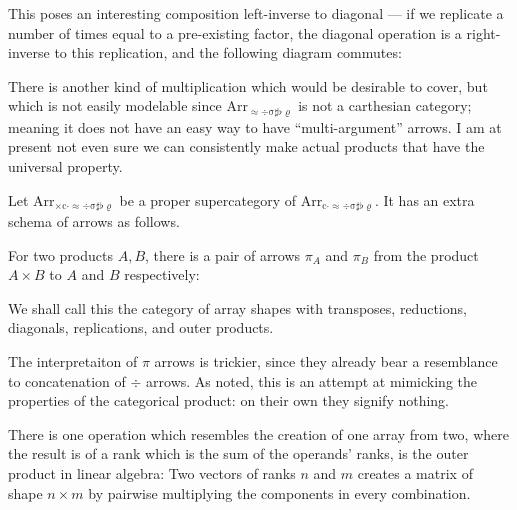 \documentclass{DIKU-report-variant}
\newcommand\mrm[1]{\mathrm{#1}}
\newcommand\brm[1]{\bm{\mrm{#1}}}
\newcommand\Arr[1]{{\brm{Arr}_{\brm{#1}}}}
\newcommand\ADSSFR{\approx\div\sigma\sharp\flat\varrho}
\newcommand\CADSSFR{c\cdot\approx\div\sigma\sharp\flat\varrho}
\newcommand\XCADSSFR{\times c\cdot\approx\div\sigma\sharp\flat\varrho}
\begin{document}
This poses an interesting composition left-inverse to
diagonal --- if we replicate a number of times equal to a pre-existing factor,
the diagonal operation is a right-inverse to this replication, and the following
diagram commutes:

\begin{center}
\end{center}

There is another kind of multiplication which would be desirable to cover, but which is
not easily modelable since \(\Arr\ADSSFR\) is not a carthesian category; meaning it does
not have an easy way to have ``multi-argument'' arrows. I am at present not even sure we can
consistently make actual products that have the universal property.

\begin{definition}
  \label{def:category-of-outer-products}
  Let \(\Arr\XCADSSFR\) be a proper supercategory of \(\Arr\CADSSFR\). It
  has an extra schema of arrows as follows.

  For two products \(A, B\), there is a pair of arrows \(\pi_A\) and \(\pi_B\)
  from the product \(A \times B\) to \(A\) and \(B\) respectively:
  \begin{center}
  \end{center}

  We shall call this the category of array shapes with transposes, reductions,
  diagonals, replications, and outer products.
\end{definition}

The interpretaiton of \(\pi\) arrows is trickier, since they already bear a resemblance
to concatenation of \(\div\) arrows. As noted, this is an attempt at mimicking
the properties of the categorical product: on their own they signify nothing.

There is one operation which resembles the creation of one array from two, where
the result is of a rank which is the sum of the operands' ranks, is the outer product
in linear algebra: Two vectors of ranks \(n\) and \(m\) creates a matrix of shape \(n\times m\)
by pairwise multiplying the components in every combination.
\end{document}
